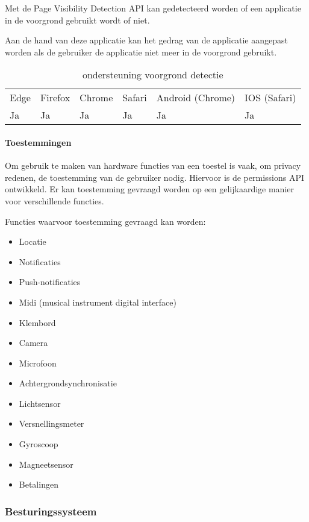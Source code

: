 Met de Page Visibility Detection API \autocite{Grigorik2020} kan gedetecteerd worden of een applicatie in de voorgrond gebruikt wordt of niet. 

Aan de hand van deze applicatie kan het gedrag van de applicatie aangepast worden als de gebruiker de applicatie niet meer in de voorgrond gebruikt.

\begin{table}[]
	\begin{tabular}{llllll}
		Edge & Firefox & Chrome & Safari & Android (Chrome) & IOS (Safari) \\
		Ja   & Ja      &  Ja     & Ja     & Ja               & Ja          
	\end{tabular}	
	\caption{ondersteuning voorgrond detectie }
	\label{ondersteuning voorgrond detectie}
\end{table}


\paragraph{Toestemmingen}

Om gebruik te maken van hardware functies van een toestel is vaak, om privacy redenen, de toestemming van de gebruiker nodig. Hiervoor is de permissions API \autocite{Caceres2020} ontwikkeld. Er kan toestemming gevraagd worden op een gelijkaardige manier voor verschillende functies.

Functies waarvoor toestemming gevraagd kan worden:
 \begin{itemize}
	\item	Locatie
	\item	Notificaties
	\item	Push-notificaties
	\item	Midi (musical instrument digital interface)
	\item	Klembord
	\item	Camera
	\item	Microfoon
	\item	Achtergrondsynchronisatie
	\item	Lichtsensor
	\item	Versnellingsmeter
	\item	Gyroscoop
	\item	Magneetsensor
	\item	Betalingen
\end{itemize}



\subsubsection{Besturingssysteem}
